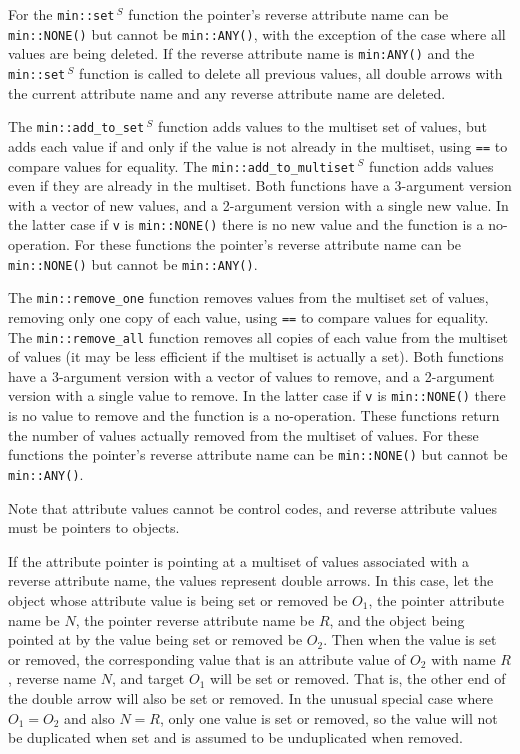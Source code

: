 \documentclass[12pt]{article}
\newcommand{\EOL}{\penalty \exhyphenpenalty}
\newcommand{\RESIZE}{$\,^S$}
\begin{document}
For the {\tt min::\EOL set\RESIZE} function
\label{MIN::SET_DELETE_ANY}
the pointer's reverse attribute name can be \verb|min::NONE()|
but cannot be \verb|min::ANY()|, with the exception of the case
where all values are being deleted.  If the reverse attribute name
is \verb|min:ANY()| and the {\tt min::\EOL set\RESIZE} function is called to
delete all previous values,
all double arrows with the current attribute name and any
reverse attribute name are deleted.

The {\tt min::\EOL add\_\EOL to\_\EOL set\RESIZE} function
adds values to the multiset set of values,
but adds each value if and only if the value is not already in the multiset,
using {\tt ==} to compare values for equality.
The {\tt min::\EOL add\_\EOL to\_\EOL multiset\RESIZE} function
adds values even if they are already in the multiset.
Both functions have a 3-argument version with a vector of new values,
and a 2-argument version with a single new value.  In the latter case
if {\tt v} is \verb|min::NONE()| there is no new value and the function
is a no-operation.
For these functions the pointer's reverse attribute name
can be \verb|min::NONE()|
but cannot be \verb|min::ANY()|.

The {\tt min::\EOL remove\_\EOL one} function
removes values from the multiset set of values, removing only one copy of
each value,
using {\tt ==} to compare values for equality.
The {\tt min::\EOL remove\_\EOL all} function
removes all copies of each value  
from the multiset of values (it may be less efficient if
the multiset is actually a set).
Both functions have a 3-argument version with a vector of values to remove,
and a 2-argument version with a single value to remove.  In the latter case
if {\tt v} is \verb|min::NONE()| there is no value to remove and the function
is a no-operation.  These functions return the number of values actually
removed from the multiset of values.
For these functions the pointer's reverse attribute name
can be \verb|min::NONE()| but cannot be \verb|min::ANY()|.

Note that attribute values cannot be control codes, and reverse attribute
values must be pointers to objects.

If the attribute pointer is pointing at a multiset of values
associated with a reverse attribute name,
the values represent double arrows.
In this case, let the object whose attribute value is being set or removed
be $O_1$, the pointer attribute name be $N$, the pointer reverse
attribute name be $R$, and the object being pointed at by the value
being set or removed be $O_2$.
Then when the value is set or removed, the corresponding value that is
an attribute value of $O_2$ with name $R$, reverse name $N$, and target $O_1$
will be set or removed.
That is, the other end of the double arrow will also be set or removed.
In the unusual special case where $O_1=O_2$ and also $N=R$, only one value
is set or removed, so the value will not be duplicated when set and is
assumed to be unduplicated when removed.
\end{document}
